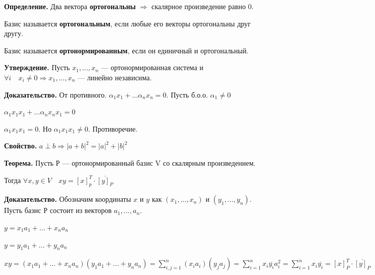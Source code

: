 \documentclass[a4paper]{article}
\begin{document}
    \newpage \begin{center}
                 \begin{Large}
                 \end{Large}
    \end{center}

    \textbf{Определение.} Два вектора \textbf{ортогональны} $\Rightarrow$ скалярное произведение равно 0.

    Базис называется \textbf{ортогональным}, если любые его векторы ортогональны друг другу.

    Базис называется \textbf{ортонормированным}, если он единичный и ортогональный.

    \begin{htheorem}
        \textbf{Утверждение.} Пусть $x_1, ..., x_n$ --- ортонормированная система и $\forall i \quad x_i \neq 0 \Rightarrow x_1, ..., x_n$ --- линейно независима.
    \end{htheorem}

    \begin{hproof}
        \textbf{Доказательство.} От противного. $\alpha_1 x_1 + ... \alpha_n x_n = 0$. Пусть б.о.о. $\alpha_1 \neq 0$

        $\alpha_1 x_1 x_1 + ... \alpha_n x_n x_1 = 0$

        $\alpha_1 x_1 x_1 = 0$. Но $\alpha_1 x_1 x_1 \neq 0$. Противоречие.
    \end{hproof}


    \begin{htheorem}
        \textbf{Свойство.} $a \perp b \Rightarrow |a+b|^2 = |a|^2 + |b|^2$
    \end{htheorem}

    \begin{htheorem}
        \textbf{Теорема.} Пусть $Р$ --- ортонормированный базис V со скалярным произведением.

        Тогда $\forall x, y \in V \quad xy = [x]_p^T \cdot \overline{[y]_P}$
    \end{htheorem}

    \begin{hproof}
        \textbf{Доказательство.} Обозначим координаты $x$ и $y$ как $(x_1, ..., x_n)$ и $(y_1, ..., y_n)$. Пусть базис $Р$ состоит из векторов $a_1, ..., a_n$.

        $y = x_1a_1+...+x_na_n$

        $y = y_1a_1 + ... + y_na_n$

        $\displaystyle xy = (x_1a_1+...+x_na_n)(y_1a_1 + ... + y_na_n) = \sum_{i,j=1}^n(x_ia_i)(y_ja_j) = \sum_{i=1}^n x_i \overline{y_i}a_i^2 = \sum_{i=1}^n x_i \overline{y_i} = [x]_P^T \cdot \overline{[y]_P}$
    \end{hproof}
\end{document}
